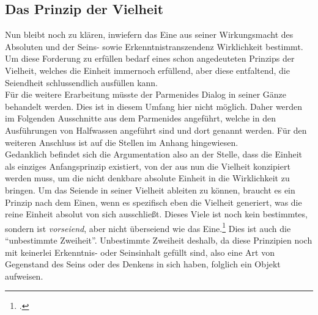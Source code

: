 \subsection{Das Prinzip der Vielheit}
Nun bleibt noch zu klären, inwiefern das Eine aus seiner Wirkungsmacht des Absoluten und der Seins- sowie Erkenntnistranszendenz Wirklichkeit bestimmt. Um diese Forderung zu erfüllen bedarf eines schon angedeuteten Prinzips der Vielheit, welches die Einheit immernoch erfüllend, aber diese entfaltend, die Seiendheit schlussendlich ausfüllen kann.\\
Für die weitere Erarbeitung müsste der Parmenides Dialog in seiner Gänze behandelt werden. Dies ist in diesem Umfang hier nicht möglich. Daher werden im Folgenden Ausschnitte aus dem Parmenides angeführt, welche in den Ausführungen von Halfwassen angeführt sind und dort genannt werden. Für den weiteren Anschluss ist auf die Stellen im Anhang hingewiesen.\\ 
Gedanklich befindet sich die Argumentation also an der Stelle, dass die Einheit als einziges Anfangsprinzip existiert, von der aus nun die Vielheit konzipiert werden muss, um die nicht denkbare absolute Einheit in die Wirklichkeit zu bringen. Um das Seiende in seiner Vielheit ableiten zu können, braucht es ein Prinzip nach dem Einen, wenn es spezifisch eben die Vielheit generiert, was die reine Einheit absolut von sich ausschließt. Dieses Viele ist noch kein bestimmtes, sondern ist \emph{vorseiend}, aber nicht überseiend wie das Eine.\footcite[vgl.][S. 103]{halfwassen2015spuren} Dies ist auch die \enquote{unbestimmte Zweiheit}. Unbestimmte Zweiheit deshalb, da diese Prinzipien noch mit keinerlei Erkenntnis- oder Seinsinhalt gefüllt sind, also eine Art von Gegenstand des Seins oder des Denkens in sich haben, folglich ein Objekt aufweisen.

